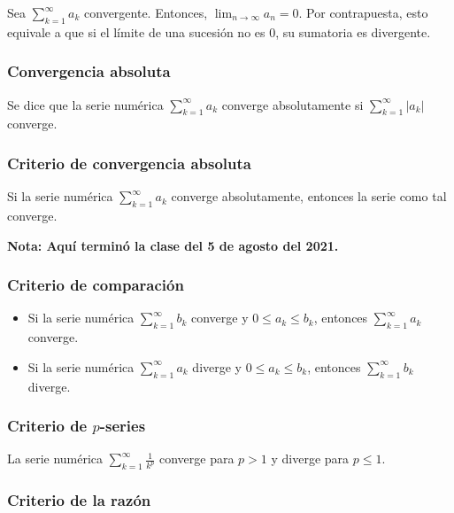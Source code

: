 \documentclass{article}
\begin{document}
Sea $\displaystyle \sum_{k=1}^{\infty}a_k$ convergente. Entonces, $\displaystyle\lim_{n\to\infty}a_n=0$. Por contrapuesta, esto equivale a que si el límite de una sucesión no es 0, su sumatoria es divergente.

\subsubsection*{Convergencia absoluta}

Se dice que la serie numérica $\displaystyle \sum_{k=1}^{\infty}a_k$ converge absolutamente si $\displaystyle \sum_{k=1}^{\infty}|a_k|$ converge.

\subsubsection*{Criterio de convergencia absoluta}

Si la serie numérica $\displaystyle \sum_{k=1}^{\infty}a_k$ converge absolutamente, entonces la serie como tal converge.

\vspace{10pt}
\textbf{Nota: Aquí terminó la clase del 5 de agosto del 2021.}

\subsubsection*{Criterio de comparación}

\begin{itemize}
\item Si la serie numérica $\displaystyle \sum_{k=1}^{\infty}b_k$ converge y $0\leq a_k\leq b_k$, entonces $\displaystyle \sum_{k=1}^{\infty}a_k$ converge.

\item Si la serie numérica $\displaystyle \sum_{k=1}^{\infty}a_k$ diverge y $0\leq a_k\leq b_k$, entonces $\displaystyle \sum_{k=1}^{\infty}b_k$ diverge.
\end{itemize}

\subsubsection*{Criterio de $p$-series}

La serie numérica $\displaystyle \sum_{k=1}^{\infty}\frac{1}{k^p}$ converge para $p>1$ y diverge para $p\leq 1$.

\subsubsection*{Criterio de la razón}
\end{document}

